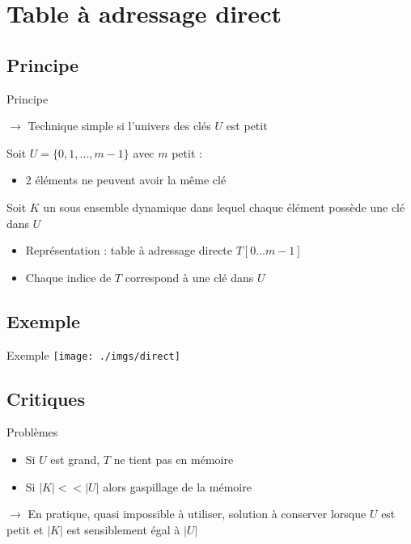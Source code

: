 \documentclass{beamer}
\begin{document}
  \section{Table à adressage direct}
  \subsection{Principe}
  \begin{frame}{Principe}

    $\rightarrow$ Technique simple si l’univers des clés $U$ est petit

    Soit $U = \{0, 1, \ldots, m - 1\}$ avec $m$ petit :
    \begin{itemize}
      \item{2 éléments ne peuvent avoir la même clé}
    \end{itemize}

    Soit $K$ un sous ensemble dynamique dans lequel chaque élément possède une clé dans $U$
    \begin{itemize}
      \item{Représentation : table à adressage directe $T[0\ldots m - 1]$}
      \item{Chaque indice de $T$ correspond à une clé dans $U$}
    \end{itemize}
  \end{frame}

  \subsection{Exemple}
  \begin{frame}{Exemple}
    \texttt{[image: ./imgs/direct]}
  \end{frame}

  \subsection{Critiques}
  \begin{frame}{Problèmes}
    \begin{itemize}
      \item{Si $U$ est grand, $T$ ne tient pas en mémoire}
      \item{Si $|K| << |U|$ alors gaspillage de la mémoire}
    \end{itemize}
    $\rightarrow$ En pratique, quasi impossible à utiliser, solution à conserver
    lorsque $U$ est petit et $|K|$ est sensiblement égal à $|U|$
  \end{frame}
\end{document}
